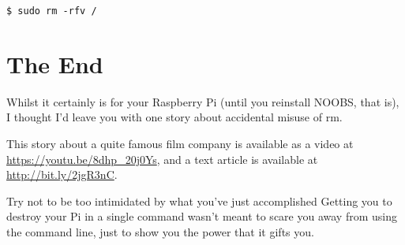 		\begin{lstlisting}[style=Terminal]
$ sudo rm -rfv /
		\end{lstlisting}

\section{The End}

	Whilst it certainly is for your Raspberry Pi (until you reinstall NOOBS, that is), I thought I'd leave you with one story about accidental misuse of rm.
	
	This story about a quite famous film company is available as a video at \url{https://youtu.be/8dhp_20j0Ys}, and a text article is available at \url{http://bit.ly/2jgR3nC}.
	
	\ifprint\else
		Try not to be too intimidated by what you've just accomplished Getting you to destroy your Pi in a single command wasn't meant to scare you away from using the command line, just to show you the power that it gifts you.
	\fi